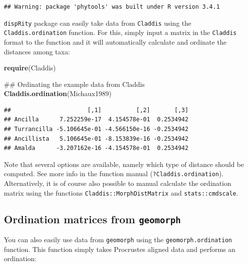 \documentclass[]{book}
\newenvironment{Shaded}{\begin{snugshade}}{\end{snugshade}}
\newcommand{\KeywordTok}[1]{\textcolor[rgb]{0.13,0.29,0.53}{\textbf{#1}}}
\newcommand{\DataTypeTok}[1]{\textcolor[rgb]{0.13,0.29,0.53}{#1}}
\newcommand{\DecValTok}[1]{\textcolor[rgb]{0.00,0.00,0.81}{#1}}
\newcommand{\StringTok}[1]{\textcolor[rgb]{0.31,0.60,0.02}{#1}}
\newcommand{\OtherTok}[1]{\textcolor[rgb]{0.56,0.35,0.01}{#1}}
\newcommand{\OperatorTok}[1]{\textcolor[rgb]{0.81,0.36,0.00}{\textbf{#1}}}
\newcommand{\NormalTok}[1]{#1}
\theoremstyle{definition}
\theoremstyle{definition}
\theoremstyle{remark}
\begin{document}
\begin{verbatim}
## Warning: package 'phytools' was built under R version 3.4.1
\end{verbatim}

\texttt{dispRity} package can easily take data from \texttt{Claddis}
using the \texttt{Claddis.ordination} function. For this, simply input a
matrix in the \texttt{Claddis} format to the function and it will
automatically calculate and ordinate the distances among taxa:

\begin{Shaded}
\begin{Highlighting}[]
\KeywordTok{require}\NormalTok{(Claddis)}

\NormalTok{## Ordinating the example data from Claddis}
\KeywordTok{Claddis.ordination}\NormalTok{(Michaux1989) }
\end{Highlighting}
\end{Shaded}

\begin{verbatim}
##                      [,1]          [,2]       [,3]
## Ancilla      7.252259e-17  4.154578e-01  0.2534942
## Turrancilla -5.106645e-01 -4.566150e-16 -0.2534942
## Ancillista   5.106645e-01 -8.153839e-16 -0.2534942
## Amalda      -3.207162e-16 -4.154578e-01  0.2534942
\end{verbatim}

Note that several options are available, namely which type of distance
should be computed. See more info in the function manual
(\texttt{?Claddis.ordination}). Alternatively, it is of course also
possible to manual calculate the ordination matrix using the functions
\texttt{Claddis::MorphDistMatrix} and \texttt{stats::cmdscale}.

\subsection{\texorpdfstring{Ordination matrices from
\texttt{geomorph}}{Ordination matrices from geomorph}}\label{ordination-matrices-from-geomorph}

You can also easily use data from \texttt{geomorph} using the
\texttt{geomorph.ordination} function. This function simply takes
Procrustes aligned data and performs an ordination:

\begin{Shaded}
\end{Shaded}
\end{document}
